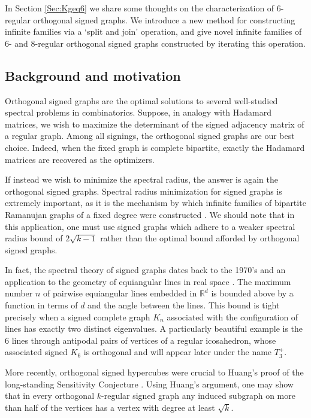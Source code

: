 \documentclass[11pt]{article}
\theoremstyle{plain}
\theoremstyle{definition}
\begin{document}
In Section \ref{Sec:Kgeq6} we share some thoughts on the characterization of $6$-regular orthogonal signed graphs. We introduce a new method for constructing infinite families via a  `split and join' operation, and give novel infinite families of 6- and 8-regular orthogonal signed graphs  constructed by iterating this operation. 


\subsection{Background and motivation}
Orthogonal signed graphs are the optimal solutions to several well-studied spectral problems in combinatorics. Suppose, in analogy with Hadamard matrices, we wish to maximize the determinant of the signed adjacency matrix of a regular graph. Among all signings, the orthogonal signed graphs are our best choice. Indeed, when the fixed graph is complete bipartite, exactly the Hadamard matrices are recovered as the optimizers. 

If instead we wish to minimize the spectral radius, the answer is again the orthogonal signed graphs. Spectral radius minimization for signed graphs is extremely important, as it is the mechanism by which infinite families of bipartite Ramanujan graphs of a fixed degree were constructed \cite{BL,MSS}. We should note that in this application, one must use signed graphs which adhere to a weaker spectral radius bound of $2\sqrt{k-1}$ rather than the optimal bound afforded by orthogonal signed graphs.  

In fact, the spectral theory of signed graphs dates back to the 1970's and an application to the geometry of equiangular lines in real space \cite{LS73}. The maximum number $n$ of pairwise equiangular lines embedded in $\mathbb{R}^d$ is bounded above by a function in terms of $d$ and the angle between the lines. This bound is tight precisely when a signed complete graph $K_n$ associated with the configuration of lines has exactly two distinct eigenvalues. A particularly beautiful example is the $6$ lines through antipodal pairs of vertices of a regular icosahedron, whose associated signed $K_6$ is orthogonal and will appear later under the name $T_3^+$.

More recently, orthogonal signed hypercubes were crucial to Huang's proof  of the long-standing Sensitivity Conjecture \cite{Hu}. 
Using  Huang's argument, one may  show  that in  every orthogonal $k$-regular signed  graph any induced subgraph on more than half of the vertices has a vertex with degree at least $\sqrt{k}$.
\end{document}
